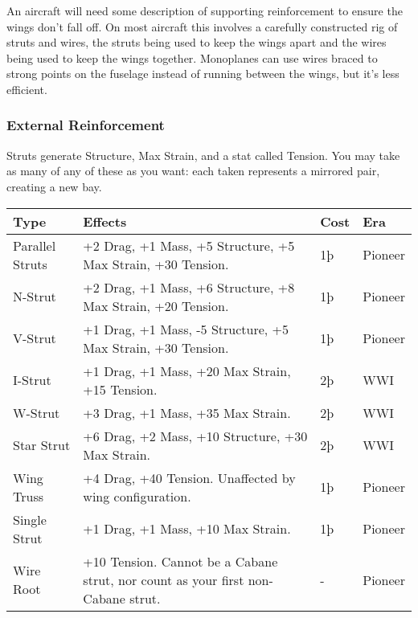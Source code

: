 \documentclass{article}
\begin{document}
An aircraft will need some description of supporting reinforcement to
ensure the wings don't fall off. On most aircraft this involves a
carefully constructed rig of struts and wires, the struts being used to
keep the wings apart and the wires being used to keep the wings
together. Monoplanes can use wires braced to strong points on the
fuselage instead of running between the wings, but it's less efficient.

\subsubsection{External Reinforcement}
\label{_External_Reinforcement}

Struts generate Structure, Max Strain, and a stat called Tension. You
may take as many of any of these as you want: each taken represents a
mirrored pair, creating a new bay.

\begin{tabular}{|l|l|l|l|}
    \hline
    Type                    & Effects                                                     & Cost    & Era     \\\hline
    Parallel Struts         & +2 Drag, +1 Mass, +5 Structure, +5 Max Strain, +30
    Tension.                & 1þ                                                          & Pioneer           \\\hline
    N-Strut                 & +2 Drag, +1 Mass, +6 Structure, +8 Max Strain, +20 Tension. &
    1þ                      & Pioneer                                                                         \\\hline
    V-Strut                 & +1 Drag, +1 Mass, -5 Structure, +5 Max Strain, +30 Tension. &
    1þ                      & Pioneer                                                                         \\\hline
    I-Strut                 & +1 Drag, +1 Mass, +20 Max Strain, +15 Tension.              & 2þ      & WWI     \\\hline
    W-Strut                 & +3 Drag, +1 Mass, +35 Max Strain.                           & 2þ      & WWI     \\\hline
    Star Strut              & +6 Drag, +2 Mass, +10 Structure, +30 Max Strain.            & 2þ      &
    WWI                                                                                                       \\\hline
    Wing Truss              & +4 Drag, +40 Tension. Unaffected by wing configuration.     &
    1þ                      & Pioneer                                                                         \\\hline
    Single Strut            & +1 Drag, +1 Mass, +10 Max Strain.                           & 1þ      & Pioneer \\\hline
    Wire Root               & +10 Tension. Cannot be a Cabane strut, nor count as your
    first non-Cabane strut. & -                                                           & Pioneer           \\\hline
\end{tabular}
\end{document}
